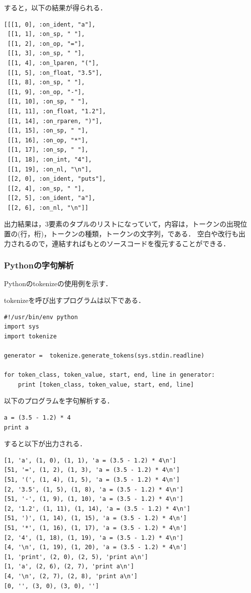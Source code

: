 \documentclass{cs-thesis}
\begin{document}
すると，以下の結果が得られる．

\begin{framed}
\begin{verbatim}
[[[1, 0], :on_ident, "a"],
 [[1, 1], :on_sp, " "],
 [[1, 2], :on_op, "="],
 [[1, 3], :on_sp, " "],
 [[1, 4], :on_lparen, "("],
 [[1, 5], :on_float, "3.5"],
 [[1, 8], :on_sp, " "],
 [[1, 9], :on_op, "-"],
 [[1, 10], :on_sp, " "],
 [[1, 11], :on_float, "1.2"],
 [[1, 14], :on_rparen, ")"],
 [[1, 15], :on_sp, " "],
 [[1, 16], :on_op, "*"],
 [[1, 17], :on_sp, " "],
 [[1, 18], :on_int, "4"],
 [[1, 19], :on_nl, "\n"],
 [[2, 0], :on_ident, "puts"],
 [[2, 4], :on_sp, " "],
 [[2, 5], :on_ident, "a"],
 [[2, 6], :on_nl, "\n"]]
\end{verbatim}
\end{framed}

出力結果は，3要素のタプルのリストになっていて，内容は，トークンの出現位置の(行，桁)，トークンの種類，トークンの文字列，である．
空白や改行も出力されるので，連結すればもとのソースコードを復元することができる．

  \subsubsection{Pythonの字句解析}
  Pythonのtokenizeの使用例を示す．

tokenizeを呼び出すプログラムは以下である．
\begin{framed}
\begin{verbatim}
#!/usr/bin/env python
import sys
import tokenize

generator =  tokenize.generate_tokens(sys.stdin.readline)

for token_class, token_value, start, end, line in generator:
    print [token_class, token_value, start, end, line]
\end{verbatim}
\end{framed}

以下のプログラムを字句解析する．
\begin{framed}
\begin{verbatim}
a = (3.5 - 1.2) * 4
print a
\end{verbatim}
\end{framed}

すると以下が出力される．
\begin{framed}
\begin{verbatim}
[1, 'a', (1, 0), (1, 1), 'a = (3.5 - 1.2) * 4\n']
[51, '=', (1, 2), (1, 3), 'a = (3.5 - 1.2) * 4\n']
[51, '(', (1, 4), (1, 5), 'a = (3.5 - 1.2) * 4\n']
[2, '3.5', (1, 5), (1, 8), 'a = (3.5 - 1.2) * 4\n']
[51, '-', (1, 9), (1, 10), 'a = (3.5 - 1.2) * 4\n']
[2, '1.2', (1, 11), (1, 14), 'a = (3.5 - 1.2) * 4\n']
[51, ')', (1, 14), (1, 15), 'a = (3.5 - 1.2) * 4\n']
[51, '*', (1, 16), (1, 17), 'a = (3.5 - 1.2) * 4\n']
[2, '4', (1, 18), (1, 19), 'a = (3.5 - 1.2) * 4\n']
[4, '\n', (1, 19), (1, 20), 'a = (3.5 - 1.2) * 4\n']
[1, 'print', (2, 0), (2, 5), 'print a\n']
[1, 'a', (2, 6), (2, 7), 'print a\n']
[4, '\n', (2, 7), (2, 8), 'print a\n']
[0, '', (3, 0), (3, 0), '']
\end{verbatim}
\end{framed}
\end{document}
